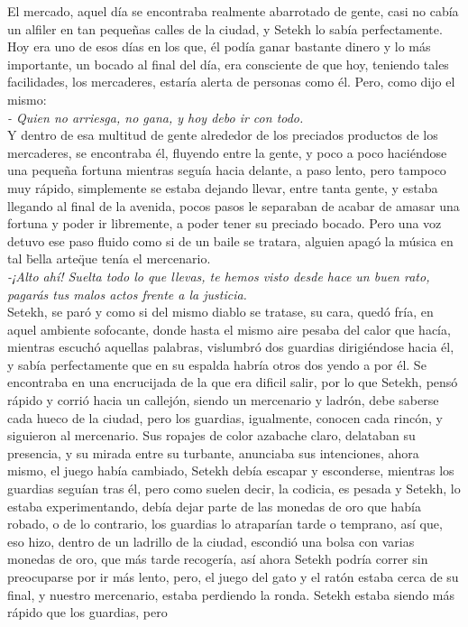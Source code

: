 El mercado, aquel día se encontraba realmente abarrotado de gente, casi no cabía un alfiler en tan pequeñas calles de la ciudad, y Setekh lo sabía perfectamente. Hoy era uno de esos días en los que,
él podía ganar bastante dinero y lo más importante, un bocado al final del día, era consciente de que hoy, teniendo tales facilidades, los mercaderes, estaría alerta de personas como él. Pero, como dijo el mismo:\\
\textit{- Quien no arriesga, no gana, y hoy debo ir con todo.}\\
Y dentro de esa multitud de gente alrededor de los preciados productos de los mercaderes, se encontraba él, fluyendo entre la gente, y poco a poco haciéndose una pequeña fortuna mientras seguía hacia delante,
a paso lento, pero tampoco muy rápido, simplemente se estaba dejando llevar, entre tanta gente, y estaba llegando al final de la avenida, pocos pasos le separaban de acabar de amasar una fortuna y poder ir libremente,
a poder tener su preciado bocado. Pero una voz detuvo ese paso fluido como si de un baile se tratara, alguien apagó la música en tal \"bella arte\" que tenía el mercenario. \\
\textit{-¡Alto ahí! Suelta todo lo que llevas, te hemos visto desde hace un buen rato, pagarás tus malos actos frente a la justicia.}\\
Setekh, se paró y como si del mismo diablo se tratase, su cara, quedó fría, en aquel ambiente sofocante, donde hasta el mismo aire pesaba del calor que hacía, mientras escuchó aquellas palabras, vislumbró dos guardias dirigiéndose hacia él, y sabía perfectamente
que en su espalda habría otros dos yendo a por él. Se encontraba en una encrucijada de la que era dificil salir, por lo que Setekh, pensó rápido y corrió hacia un callejón, siendo un mercenario y ladrón, debe saberse cada hueco de la ciudad, pero los guardias, igualmente,
conocen cada rincón, y siguieron al mercenario. Sus ropajes de color azabache claro, delataban su presencia, y su mirada entre su turbante, anunciaba sus intenciones, ahora mismo, el juego había cambiado, Setekh debía escapar y esconderse, mientras los guardias seguían tras él,
pero como suelen decir, la codicia, es pesada y Setekh, lo estaba experimentando, debía dejar parte de las monedas de oro que había robado, o de lo contrario, los guardias lo atraparían tarde o temprano, así que, eso hizo, dentro de un ladrillo de la ciudad, escondió una bolsa
con varias monedas de oro, que más tarde recogería, así ahora Setekh podría correr sin preocuparse por ir más lento, pero, el juego del gato y el ratón estaba cerca de su final, y nuestro mercenario, estaba perdiendo la ronda. Setekh estaba siendo más rápido que los guardias, pero
